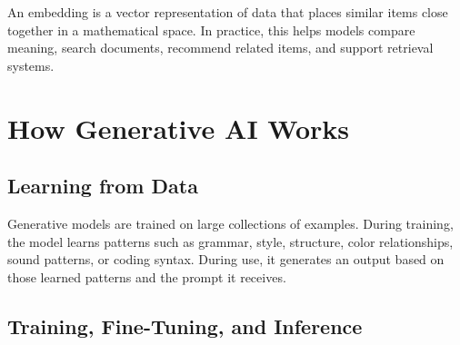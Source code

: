 \documentclass[11pt,a4paper]{article}
\begin{document}
\begin{definitionbox}[Embedding]
An embedding is a vector representation of data that places similar items close together in a mathematical space. In practice, this helps models compare meaning, search documents, recommend related items, and support retrieval systems.
\end{definitionbox}

\section{How Generative AI Works}

\subsection{Learning from Data}

\begin{conceptbox}
Generative models are trained on large collections of examples. During training, the model learns patterns such as grammar, style, structure, color relationships, sound patterns, or coding syntax. During use, it generates an output based on those learned patterns and the prompt it receives.
\end{conceptbox}

\subsection{Training, Fine-Tuning, and Inference}

\begin{center}
\end{center}
\end{document}
